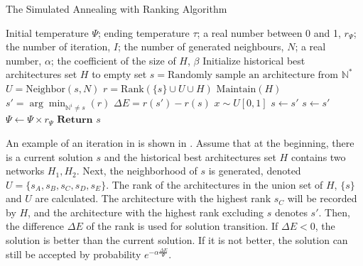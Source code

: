 \documentclass[sigconf]{acmart}
\begin{document}
    \begin{algorithm}[h]
        \caption{The Simulated Annealing with Ranking Algorithm}\label{alg:SA}
        \begin{algorithmic}[1]
            \Parameter Initial temperature $\Psi$; ending temperature $\tau$; a real number between 0 and 1, $r_\Psi$; the number of iteration, $I$; the number of generated neighbours, $N$; a real number, $\alpha$; the coefficient of the size of $H$, $\beta$
            \State Initialize historical best architectures set $H$ to empty set
            \State $s=\text{Randomly sample an architecture from }\mathbb N^*$
            \While{$\Psi>\tau$}
                    \State $U = \text{Neighbor}(s, N)$
                    \State $r=\text{Rank}(\{s\}\cup U\cup H)$
                    \State $\text{Maintain}(H)$
                    \State $s'=\arg\min_{\mathbb N^i\neq s}(r)$
                    \State $\Delta E=r(s')-r(s)$
                    \State $x\sim U[0,1]$
                        \State $s\leftarrow s'$
                            \State $s\leftarrow s'$
                    \EndIf
                \EndFor
                \State $\Psi\leftarrow \Psi\times r_\Psi$
            \EndWhile
            \State $\textbf{Return }s$ 
        \end{algorithmic}
    \end{algorithm}

    An example of an iteration in \palg{} is shown in . 
    Assume that at the beginning, there is a current solution $s$ and the historical best 
    architectures set $H$ contains two networks $H_1, H_2$. Next, the neighborhood of $s$ is generated, 
    denoted $U=\{s_A,s_B,s_C,s_D,s_E\}$. The rank of the architectures in the union 
    set of $H$, $\{s\}$ and $U$ are calculated. The architecture with the highest rank 
    $s_C$ will be recorded by $H$, and the architecture with the highest rank excluding 
    $s$ denotes $s'$. Then, the difference $\Delta E$ of the rank is used for 
    solution transition. If $\Delta E<0$, the solution is better than the current 
    solution. If it is not better, the solution can still be accepted by probability 
    $e^{-\alpha\frac{\Delta E}{\Psi}}$. 
    
\end{document}
